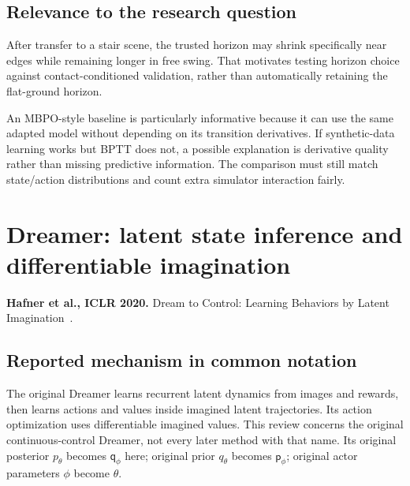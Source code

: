\subsection{Relevance to the research question}
After transfer to a stair scene, the trusted horizon may shrink specifically near
edges while remaining longer in free swing. That motivates testing horizon choice
against contact-conditioned validation, rather than automatically retaining the
flat-ground horizon.

An MBPO-style baseline is particularly informative because it can use the same
adapted model without depending on its transition derivatives. If synthetic-data
learning works but BPTT does not, a possible explanation is derivative quality
rather than missing predictive information. The comparison must still match
state/action distributions and count extra simulator interaction fairly.

\section{Dreamer: latent state inference and differentiable imagination}\label{sec:dreamer}
\textbf{Hafner et al., ICLR 2020.} Dream to Control: Learning Behaviors by
Latent Imagination~\cite{dreamer}.

\subsection{Reported mechanism in common notation}
The original Dreamer learns recurrent latent dynamics from images and rewards,
then learns actions and values inside imagined latent trajectories. Its action
optimization uses differentiable imagined values. This review concerns the
original continuous-control Dreamer, not every later method with that name.
Its original posterior $p_\theta$ becomes $\mathsf q_\phi$ here; original prior
$q_\theta$ becomes $\mathsf p_\phi$; original actor parameters $\phi$ become $\theta$.

